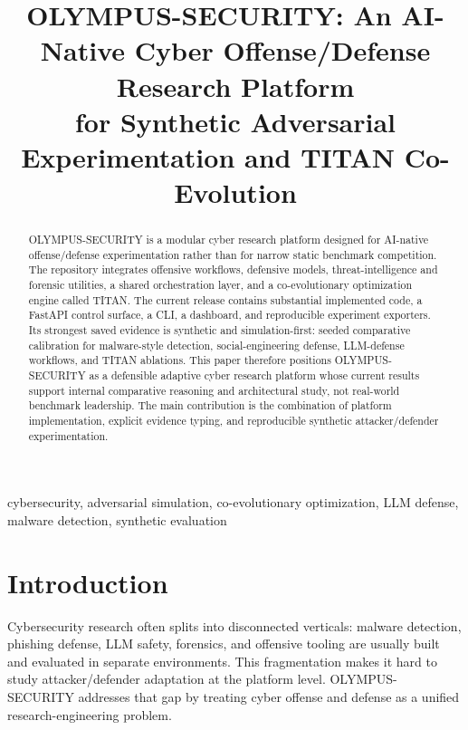 \documentclass[conference]{IEEEtran}
\begin{document}
\title{OLYMPUS-SECURITY: An AI-Native Cyber Offense/Defense Research Platform\\for Synthetic Adversarial Experimentation and TITAN Co-Evolution}

\author{
}

\maketitle

\begin{abstract}
OLYMPUS-SECURITY is a modular cyber research platform designed for AI-native
offense/defense experimentation rather than for narrow static benchmark
competition. The repository integrates offensive workflows, defensive models,
threat-intelligence and forensic utilities, a shared orchestration layer, and a
co-evolutionary optimization engine called TITAN. The current release contains
substantial implemented code, a FastAPI control surface, a CLI, a dashboard, and
reproducible experiment exporters. Its strongest saved evidence is synthetic and
simulation-first: seeded comparative calibration for malware-style detection,
social-engineering defense, LLM-defense workflows, and TITAN ablations. This
paper therefore positions OLYMPUS-SECURITY as a defensible adaptive cyber
research platform whose current results support internal comparative reasoning
and architectural study, not real-world benchmark leadership. The main
contribution is the combination of platform implementation, explicit evidence
typing, and reproducible synthetic attacker/defender experimentation.
\end{abstract}

\begin{IEEEkeywords}
cybersecurity, adversarial simulation, co-evolutionary optimization, LLM defense, malware detection, synthetic evaluation
\end{IEEEkeywords}

\section{Introduction}

Cybersecurity research often splits into disconnected verticals: malware
detection, phishing defense, LLM safety, forensics, and offensive tooling are
usually built and evaluated in separate environments. This fragmentation makes it
hard to study attacker/defender adaptation at the platform level. OLYMPUS-SECURITY
addresses that gap by treating cyber offense and defense as a unified
research-engineering problem.
\end{document}
